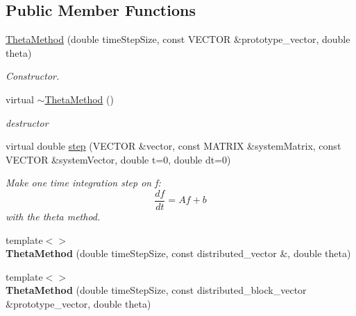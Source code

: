 \subsection*{Public Member Functions}
\begin{DoxyCompactItemize}
\item 
\hyperlink{classnatrium_1_1ThetaMethod_a7b5ec1aa8b646768c45cc422651ec905}{ThetaMethod} (double timeStepSize, const VECTOR \&prototype\_\-vector, double theta)
\begin{DoxyCompactList}\small\item\em Constructor. \item\end{DoxyCompactList}\item 
\hypertarget{classnatrium_1_1ThetaMethod_ac742c678ab9674722295585f10d27279}{
virtual \hyperlink{classnatrium_1_1ThetaMethod_ac742c678ab9674722295585f10d27279}{$\sim$ThetaMethod} ()}
\label{classnatrium_1_1ThetaMethod_ac742c678ab9674722295585f10d27279}

\begin{DoxyCompactList}\small\item\em destructor \item\end{DoxyCompactList}\item 
virtual double \hyperlink{classnatrium_1_1ThetaMethod_a247c639f49a05904dae01b05115bc7e4}{step} (VECTOR \&vector, const MATRIX \&systemMatrix, const VECTOR \&systemVector, double t=0, double dt=0)
\begin{DoxyCompactList}\small\item\em Make one time integration step on f: \[ \frac{df}{dt} = Af+b \] with the theta method. \item\end{DoxyCompactList}\item 
\hypertarget{classnatrium_1_1ThetaMethod_a8ab913e8242378d6877ef6dcee80aebb}{
{\footnotesize template$<$$>$ }\\{\bfseries ThetaMethod} (double timeStepSize, const distributed\_\-vector \&, double theta)}
\label{classnatrium_1_1ThetaMethod_a8ab913e8242378d6877ef6dcee80aebb}

\item 
\hypertarget{classnatrium_1_1ThetaMethod_ac5b08a9ab08f4f61779dc818a6dac3b2}{
{\footnotesize template$<$$>$ }\\{\bfseries ThetaMethod} (double timeStepSize, const distributed\_\-block\_\-vector \&prototype\_\-vector, double theta)}
\label{classnatrium_1_1ThetaMethod_ac5b08a9ab08f4f61779dc818a6dac3b2}


\end{DoxyCompactItemize}
